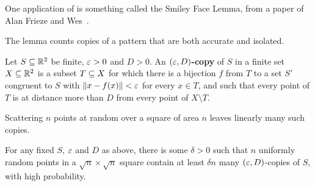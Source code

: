 One application of  is something called the Smiley Face Lemma, from a paper of Alan Frieze and Wes~\cite{FriezePegdenSubadditive}.

The lemma counts copies of a pattern that are both accurate and isolated.

\begin{boxdefinition}
    Let $S \subseteq \mathbb{R}^2$ be finite, $\varepsilon > 0$ and $D > 0$. An \textbf{$(\varepsilon, D)$-copy} of $S$ in a finite set $X \subseteq \mathbb{R}^2$ is a subset $T \subseteq X$ for which there is a bijection $f$ from $T$ to a set $S'$ congruent to $S$ with $\left\lVert x - f(x) \right\rVert < \varepsilon$ for every $x \in T$, and such that every point of $T$ is at distance more than $D$ from every point of $X \setminus T$.
\end{boxdefinition}

Scattering $n$ points at random over a square of area $n$ leaves linearly many such copies.

\begin{boxlemma}
    For any fixed $S$, $\varepsilon$ and $D$ as above, there is some $\delta > 0$ such that $n$ uniformly random points in a $\sqrt{n} \times \sqrt{n}$ square contain at least $\delta n$ many $(\varepsilon, D)$-copies of $S$, with high probability.
\end{boxlemma}

